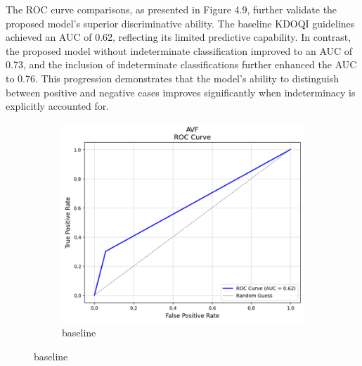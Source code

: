 The ROC curve comparisons, as presented in Figure 4.9, further validate the proposed model's superior discriminative ability. The baseline KDOQI guidelines achieved an AUC of 0.62, reflecting its limited predictive capability. In contrast, the proposed model without indeterminate classification improved to an AUC of 0.73, and the inclusion of indeterminate classifications further enhanced the AUC to 0.76. This progression demonstrates that the model's ability to distinguish between positive and negative cases improves significantly when indeterminacy is explicitly accounted for.

\begin{figure}[H]
    \centering
    \begin{subfigure}[b]{0.5\textwidth}
        \centering
        \includegraphics[width=\linewidth]{figures/AVF_baseline_roc.png}
        \caption{baseline}
        \label{fig:vascular-access-roc}
    \end{subfigure}
    
    \vspace{1em} %


\end{figure}
